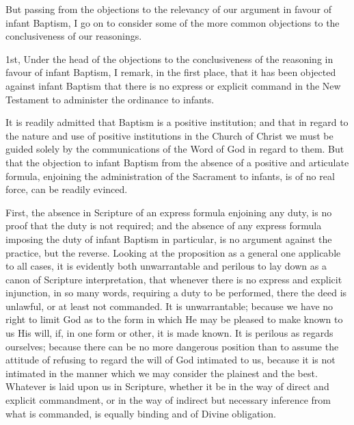 \documentclass[]{book}
\begin{document}
But passing from the objections to the relevancy of our argument in favour of infant Baptism, I go on to consider some of the more common objections to the conclusiveness of our reasonings.

1st, Under the head of the objections to the conclusiveness of the reasoning in favour of infant Baptism, I remark, in the first place, that it has been objected against infant Baptism that there is no express or explicit command in the New Testament to administer the ordinance to infants.

It is readily admitted that Baptism is a positive institution; and that in regard to the nature and use of positive institutions in the Church of Christ we must be guided solely by the communications of the Word of God in regard to them. But that the objection to infant Baptism from the absence of a positive and articulate formula, enjoining the administration of the Sacrament to infants, is of no real force, can be readily evinced.

First, the absence in Scripture of an express formula enjoining any duty, is no proof that the duty is not required; and the absence of any express formula imposing the duty of infant Baptism in particular, is no argument against the practice, but the reverse. Looking at the proposition as a general one applicable to all cases, it is evidently both unwarrantable and perilous to lay down as a canon of Scripture interpretation, that whenever there is no express and explicit injunction, in so many words, requiring a duty to be performed, there the deed is unlawful, or at least not commanded. It is unwarrantable; because we have no right to limit God as to the form in which He may be pleased to make known to us His will, if, in one form or other, it is made known. It is perilous as regards ourselves; because there can be no more dangerous position than to assume the attitude of refusing to regard the will of God intimated to us, because it is not intimated in the manner which we may consider the plainest and the best. Whatever is laid upon us in Scripture, whether it be in the way of direct and explicit commandment, or in the way of indirect but necessary inference from what is commanded, is equally binding and of Divine obligation.
\end{document}
